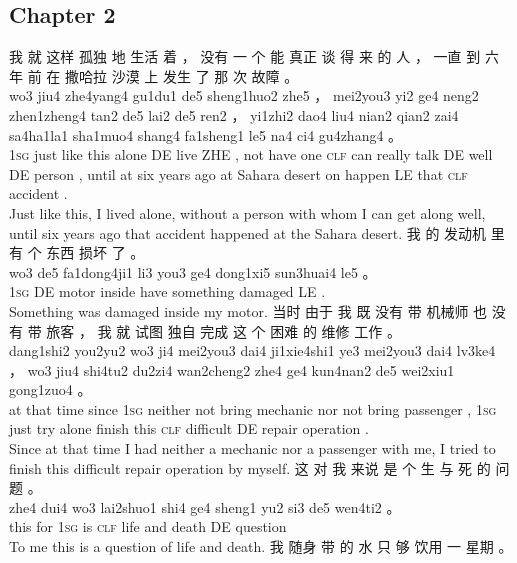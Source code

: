 \documentclass[UTF8]{ctexart}
\begin{document}
\newpage 

\subsection*{Chapter 2}
\begin{exe}
\ex
\glll
我 就 这样 孤独 地 生活 着 ， 没有 一 个 能 真正 谈 得 来 的 人 ， 一直 到 六 年 前 在 撒哈拉 沙漠 上 发生 了 那 次 故障 。
\\
wo3 jiu4 zhe4yang4 gu1du1 de5 sheng1huo2 zhe5 ， mei2you3 yi2 ge4 neng2 zhen1zheng4 tan2 de5 lai2 de5 ren2 ， yi1zhi2 dao4 liu4 nian2 qian2 zai4 sa4ha1la1 sha1muo4 shang4 fa1sheng1 le5 na4 ci4 gu4zhang4 。
\\
\textsc{1sg} just {like this} alone DE live ZHE , {not have} one \textsc{clf} can really talk DE {well} DE person , until at six years ago at Sahara desert on happen LE that \textsc{clf} accident . 
\\
\trans Just like this, I lived alone, without a person with whom I can get along well, until six years ago that accident happened at the Sahara desert. 
\ex
\glll
我 的 发动机 里 有 个 东西 损坏 了 。
\\
wo3 de5 fa1dong4ji1 li3 you3 ge4 dong1xi5 sun3huai4 le5 。
\\
\textsc{1sg} DE motor inside have something damaged LE .
\\
\trans Something was damaged inside my motor. 
\ex
\glll
当时 由于 我 既 没有 带 机械师 也 没有 带 旅客 ， 我 就 试图 独自 完成 这 个 困难 的 维修 工作 。
\\
dang1shi2 you2yu2 wo3 ji4 mei2you3 dai4 ji1xie4shi1 ye3 mei2you3 dai4 lv3ke4 ， wo3 jiu4 shi4tu2 du2zi4 wan2cheng2 zhe4 ge4 kun4nan2 de5 wei2xiu1 gong1zuo4 。
\\
{at that time} since \textsc{1sg} neither not bring mechanic nor not bring passenger , \textsc{1sg} just try alone finish this \textsc{clf} difficult DE repair operation .
\\
\trans Since at that time I had neither a mechanic nor a passenger with me, I tried to finish this difficult repair operation by myself. 
\ex
\glll
这 对 我 来说 是 个 生 与 死 的 问题 。
\\
zhe4 dui4 wo3 lai2shuo1 shi4 ge4 sheng1 yu2 si3 de5 wen4ti2 。
\\
this for \textsc{1sg} {} is \textsc{clf} life and death DE question
\\
\trans To me this is a question of life and death. 
\ex
\glll
我 随身 带 的 水 只 够 饮用 一 星期 。
\\

\end{exe}
\end{document}
